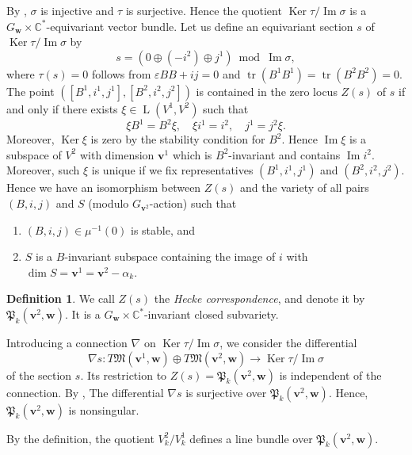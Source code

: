 \documentclass[12pt]{amsart}
\def\Bbb{\mathbb}
\def\frak{\mathfrak}
\renewcommand{\labelenumi}{(\theenumi)}%
\newenvironment{aenume}{%
  \begin{enumerate}%
  \renewcommand{\theenumi}{\alph{enumi}}%
  \renewcommand{\labelenumi}{(\theenumi)}%
  }{\end{enumerate}}
\theoremstyle{definition}
\newtheorem{Definition}[equation]{Definition}
\theoremstyle{remark}
\numberwithin{equation}{subsection}
\newcommand{\C}{{\Bbb C}}
\newcommand{\Ker}{\operatorname{Ker}}
\newcommand{\Ima}{\operatorname{Im}}
\newcommand{\tr}{\operatorname{tr}}
\newcommand{\M}{{\frak M}} %
\newcommand{\bv}{{\mathbf v}} %
\newcommand{\bw}{{\mathbf w}} %
\newcommand{\Pa}{{\frak P}} %
\newcommand{\HomL}{\operatorname{L}}
\begin{document}
By \cite[5.2]{Na-alg}, $\sigma$ is injective and $\tau$ is surjective.
Hence the quotient $\Ker \tau/\Ima \sigma$ is a
$G_\bw\times\C^*$-equivariant vector bundle. Let us define an
equivariant section $s$ of $\Ker \tau/\Ima \sigma$ by
\begin{equation}
        s = \left( 0 \oplus (-i^2) \oplus j^1 \right) \bmod{\Ima \sigma},
\end{equation}
where $\tau(s) = 0$ follows from $\varepsilon BB+ij=0$ and
$\tr(B^1 B^1) = \tr(B^2 B^2) = 0$.
The point $([B^1, i^1, j^1], [B^2, i^2, j^2])$ is contained in
the zero locus $Z(s)$ of $s$ if and only if
there exists $\xi \in \HomL(V^1, V^2)$ such that
\begin{equation}
        \xi B^1 = B^2 \xi, \quad
        \xi i^1 = i^2, \quad
        j^1 = j^2 \xi.
\label{hecke:xi}\end{equation}
Moreover, $\Ker \xi$ is zero by the stability condition for $B^2$.
Hence $\Ima \xi$ is a subspace of $V^2$ with dimension $\bv^1$ which
is $B^2$-invariant and contains $\Ima i^2$.
Moreover, such $\xi$ is unique if we fix representatives
$(B^1,i^1,j^1)$ and $(B^2,i^2,j^2)$.
Hence we have an isomorphism between $Z(s)$ and the variety of all 
pairs $(B, i, j)$ and $S$ (modulo $G_{\bv^2}$-action) such that
\begin{aenume}
\item $(B, i, j)\in\mu^{-1}(0)$ is stable, and
\item $S$ is a $B$-invariant subspace containing the image of $i$ with
         $\dim S = \bv^1 = \bv^2 - \alpha_k$.
\end{aenume}

\begin{Definition}\label{def:hecke}
We call $Z(s)$ the {\it Hecke correspondence}, and denote it by
$\Pa_k(\bv^2,\bw)$. It is a $G_\bw\times\C^*$-invariant closed
subvariety.
\end{Definition}

Introducing a connection $\nabla$ on $\Ker \tau/\Ima \sigma$, we
consider the differential
\begin{equation*}
        \nabla s\colon T\M(\bv^1,\bw)\oplus T\M(\bv^2,\bw)
        \to \Ker \tau/ \Ima \sigma
\end{equation*}
of the section $s$.
Its restriction to $Z(s) = \Pa_k(\bv^2,\bw)$ is independent of the
connection.
%
By \cite[5.7]{Na-alg},
The differential $\nabla s$ is surjective over $\Pa_k(\bv^2,\bw)$.
Hence, $\Pa_k(\bv^2,\bw)$ is nonsingular.

By the definition, the quotient $V_k^2/V_k^1$ defines a line bundle
over $\Pa_k(\bv^2,\bw)$.
\end{document}

